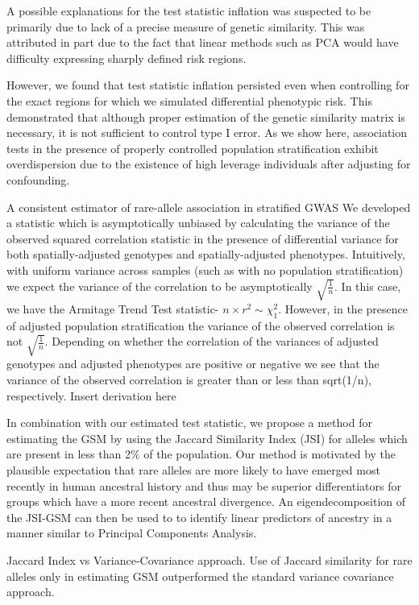 \documentclass[english]{article}
\begin{document}
A possible explanations for the test statistic inflation was suspected
to be primarily due to lack of a precise measure of genetic similarity.
This was attributed in part due to the fact that linear methods such
as PCA would have difficulty expressing sharply defined risk regions.

However, we found that test statistic inflation persisted even when
controlling for the exact regions for which we simulated differential
phenotypic risk. This demonstrated that although proper estimation
of the genetic similarity matrix is necessary, it is not sufficient
to control type I error. As we show here, association tests in the
presence of properly controlled population stratification exhibit
overdispersion due to the existence of high leverage individuals after
adjusting for confounding. 

A consistent estimator of rare-allele association in stratified GWAS
We developed a statistic which is asymptotically unbiased by calculating
the variance of the observed squared correlation statistic in the
presence of differential variance for both spatially-adjusted genotypes
and spatially-adjusted phenotypes. Intuitively, with uniform variance
across samples (such as with no population stratification) we expect
the variance of the correlation to be asymptotically $\sqrt{\frac{1}{n}}$.
In this case, we have the Armitage Trend Test statistic- $n\times r^{2}\sim\chi_{1}^{2}$.
However, in the presence of adjusted population stratification the
variance of the observed correlation is not $\sqrt{\frac{1}{n}}$.
Depending on whether the correlation of the variances of adjusted
genotypes and adjusted phenotypes are positive or negative we see
that the variance of the observed correlation is greater than or less
than sqrt(1/n), respectively. Insert derivation here

In combination with our estimated test statistic, we propose a method
for estimating the GSM by using the Jaccard Similarity Index (JSI)
for alleles which are present in less than 2\% of the population.
Our method is motivated by the plausible expectation that rare alleles
are more likely to have emerged most recently in human ancestral history
and thus may be superior differentiators for groups which have a more
recent ancestral divergence. An eigendecomposition of the JSI-GSM
can then be used to to identify linear predictors of ancestry in a
manner similar to Principal Components Analysis.

Jaccard Index vs Variance-Covariance approach. Use of Jaccard similarity
for rare alleles only in estimating GSM outperformed the standard
variance covariance approach.
\end{document}
